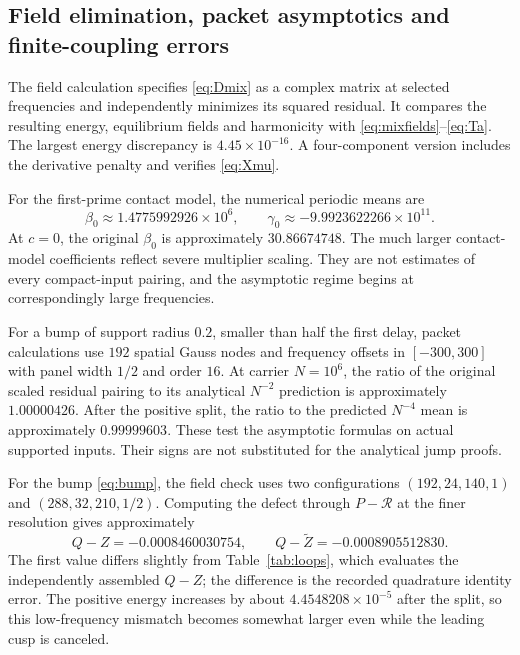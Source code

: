 \documentclass[11pt]{article}
\numberwithin{equation}{section}
\theoremstyle{definition}
\theoremstyle{remark}
\begin{document}
\subsection{Field elimination, packet asymptotics and finite-coupling errors}
The field calculation specifies \eqref{eq:Dmix} as a complex matrix at selected frequencies and independently minimizes its squared residual. It compares the resulting energy, equilibrium fields and harmonicity with \eqref{eq:mixfields}--\eqref{eq:Ta}. The largest energy discrepancy is $4.45\times10^{-16}$. A four-component version includes the derivative penalty and verifies \eqref{eq:Xmu}.

For the first-prime contact model, the numerical periodic means are
\begin{equation}
 \beta_0\approx1.4775992926\times10^6,
 \qquad\gamma_0\approx-9.9923622266\times10^{11}.
\end{equation}
At $c=0$, the original $\beta_0$ is approximately $30.86674748$. The much larger contact-model coefficients reflect severe multiplier scaling. They are not estimates of every compact-input pairing, and the asymptotic regime begins at correspondingly large frequencies.

For a bump of support radius $0.2$, smaller than half the first delay, packet calculations use $192$ spatial Gauss nodes and frequency offsets in $[-300,300]$ with panel width $1/2$ and order $16$. At carrier $N=10^6$, the ratio of the original scaled residual pairing to its analytical $N^{-2}$ prediction is approximately $1.00000426$. After the positive split, the ratio to the predicted $N^{-4}$ mean is approximately $0.99999603$. These test the asymptotic formulas on actual supported inputs. Their signs are not substituted for the analytical jump proofs.

For the bump \eqref{eq:bump}, the field check uses two configurations $(192,24,140,1)$ and $(288,32,210,1/2)$. Computing the defect through $P-\mathscr R$ at the finer resolution gives approximately
\begin{equation}
 Q-Z=-0.0008460030754,\qquad
 Q-\widetilde Z=-0.0008905512830.
\end{equation}
The first value differs slightly from Table~\ref{tab:loops}, which evaluates the independently assembled $Q-Z$; the difference is the recorded quadrature identity error. The positive energy increases by about $4.4548208\times10^{-5}$ after the split, so this low-frequency mismatch becomes somewhat larger even while the leading cusp is canceled.
\end{document}
